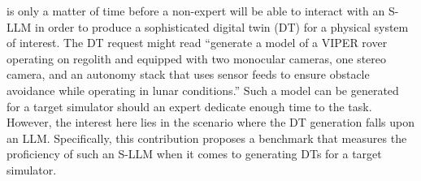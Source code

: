 
 is only a matter of time before a non-expert will be able to interact with an S-LLM in order to produce a sophisticated digital twin (DT) for a physical system of interest. The DT request might read ``generate a model of a VIPER rover operating on regolith and equipped with two monocular cameras, one stereo camera, and an autonomy stack that uses sensor feeds to ensure obstacle avoidance while operating in lunar conditions.'' Such a model can be generated for a target simulator should an expert dedicate enough time to the task. However, the interest here lies in the scenario where the DT generation falls upon an LLM. Specifically, this contribution proposes a benchmark that measures the proficiency of such an S-LLM when it comes to generating DTs for a target simulator. 

